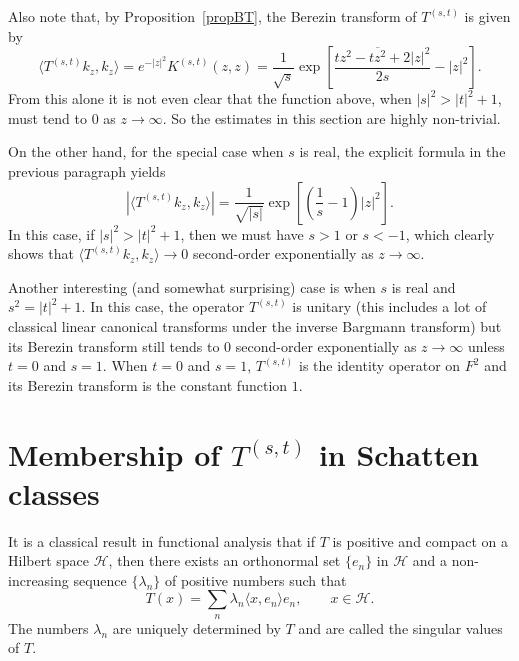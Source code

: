 \documentclass[reqno]{amsart}
\begin{document}
Also note that, by Proposition~\ref{propBT}, the Berezin transform of
$T^{(s,t)}$ is given by
$$\langle T^{(s,t)}k_z, k_z\rangle=e^{-|z|^2}K^{(s,t)}(z,z)=
\frac1{\sqrt s}\exp\left[\frac{tz^2-\overline{tz^2}+2|z|^2}{2s}
-|z|^2\right].$$
From this alone it is not even clear that the function above, when
$|s|^2>|t|^2+1$, must tend to $0$ as $z\to\infty$. So the estimates
in this section are highly non-trivial.

On the other hand, for the special case when $s$ is real, the explicit
formula in the previous paragraph yields
$$|\langle T^{(s,t)}k_z, k_z\rangle|=\frac1{\sqrt{|s|}}
\exp\left[\left(\frac1s-1\right)|z|^2\right].$$
In this case, if $|s|^2>|t|^2+1$, then we must have $s>1$ or $s<-1$,
which clearly shows that $\langle T^{(s,t)}k_z, k_z\rangle\to0$
second-order exponentially as $z\to\infty$.

Another interesting (and somewhat surprising) case is when $s$ is real
and $s^2=|t|^2+1$. In this case, the operator $T^{(s,t)}$ is unitary
(this includes a lot of classical linear canonical transforms under the
inverse Bargmann transform) but its Berezin transform still tends to $0$ 
second-order exponentially as $z\to\infty$ unless $t=0$ and $s=1$. 
When $t=0$ and $s=1$, $T^{(s,t)}$ is the identity operator on $F^2$ 
and its Berezin transform is the constant function $1$.




\section{Membership of $T^{(s,t)}$ in Schatten classes}

It is a classical result in functional analysis that if $T$ is positive and compact
on a Hilbert space $\mathcal{H}$, then there exists an orthonormal set
$\{e_n\}$ in $\mathcal{H}$ and a non-increasing sequence $\{\lambda_n\}$
of positive numbers such that
$$T(x)=\sum_{n}\lambda_n\langle x,e_n\rangle e_n,\qquad x\in\mathcal{H}.$$
The numbers $\lambda_n$ are uniquely determined by $T$ and are called
the singular values of $T$.
\end{document}
